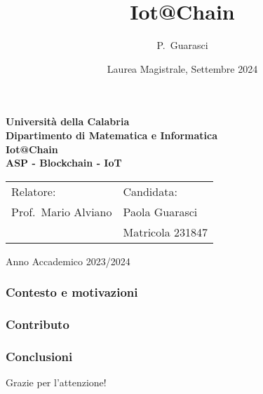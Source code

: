 \documentclass{beamer}
\title[Iot@Chain] %
{Iot@Chain}
\author[Paola Guarasic] %
{P.~Guarasci\inst{1}}
\institute[Unical] %
{
  \inst{1}%
  Dipartimento di Matematica e Informatica\\
  Università della Calabria
}
\date[Laurea Magistrale 2024] %
{Laurea Magistrale, Settembre 2024}
\begin{document}




{
\begin{frame}[noframenumbering]
  \begin{center}
    \textbf{\LARGE Universit\`a della Calabria}\\
    \textbf{Dipartimento di Matematica e Informatica}\\
    \vskip 20pt
      { \huge \bfseries Iot@Chain\\[0.4cm]ASP - Blockchain - IoT}\\[0.2cm]
    \vskip 25pt

    \begin{tabular}{p{7cm}p{3cm}}
      Relatore:           & Candidata:       \\
      Prof.~Mario Alviano & Paola Guarasci   \\
                          & Matricola 231847 \\
    \end{tabular}

    \vskip 40pt
    \vskip 5pt
    Anno Accademico 2023/2024
    \vfill
  \end{center}
\end{frame}
}


\begin{frame}
  \frametitle{Contesto e motivazioni}
\end{frame}

\begin{frame}
  \frametitle{Contributo}
\end{frame}

\begin{frame}
  \frametitle{Conclusioni}
\end{frame}


{
\begin{frame}[noframenumbering]
  \begin{center}
    \vfill{\hfill}

    \centering
    \LARGE Grazie per l'attenzione!

    \vfill{\hfill}
  \end{center}
\end{frame}
}
\end{document}
